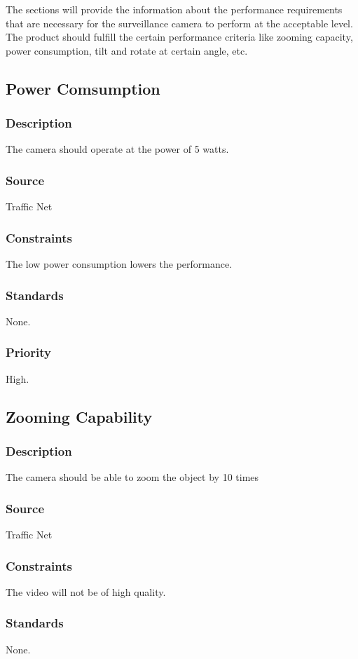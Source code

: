 The sections will provide the information about the performance requirements that are necessary for the surveillance camera to perform at the acceptable level. The product should fulfill the certain performance criteria like zooming capacity, power consumption, tilt and rotate at certain angle, etc. 


\subsection{Power Comsumption}
\subsubsection{Description}
The camera should operate at the power of 5 watts.
\subsubsection{Source}
Traffic Net
\subsubsection{Constraints}
The low power consumption lowers the performance.
\subsubsection{Standards}
None.
\subsubsection{Priority}
High.


\subsection{Zooming Capability}
\subsubsection{Description}
The camera should be able to zoom the object by 10 times
\subsubsection{Source}
Traffic Net
\subsubsection{Constraints}
The video will not be of high quality.
\subsubsection{Standards}
None.
